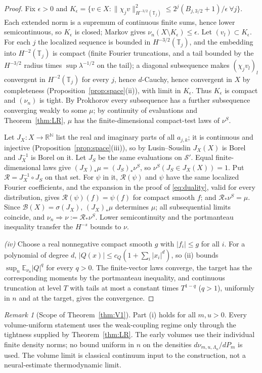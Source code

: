 \documentclass[11pt]{article}
\theoremstyle{plain}
\theoremstyle{definition}
\theoremstyle{remark}
\newtheorem{remark}[theorem]{Remark}
\newcommand{\R}{\mathbb{R}}
\newcommand{\N}{\mathbb{N}}
\newcommand{\E}{\mathbb{E}}
\newcommand{\T}{\mathbb{T}}
\newcommand{\cB}{\mathcal{B}}
\newcommand{\cS}{\mathcal{S}}
\begin{document}
\begin{proof}
Fix $\epsilon>0$ and $K_\epsilon=\{v\in X:\|\chi_jv\|^{2}_{H^{-3/2}(\T_j)}\le2^{j}(B_{j,3/2}+1)/\epsilon\ \forall j\}$.
Each extended norm is a supremum of continuous finite sums, hence lower
semicontinuous, so $K_\epsilon$ is closed; Markov gives $\nu_n(X\setminus K_\epsilon)\le\epsilon$. Let
$(v_l)\subset K_\epsilon$. For each $j$ the localized sequence is bounded in $H^{-3/2}(\T_j)$,
and the embedding into $H^{-2}(\T_j)$ is compact (finite Fourier truncations, and
a tail bounded by the $H^{-3/2}$ radius times $\sup\lambda^{-1/2}$ on the tail); a
diagonal subsequence makes $(\chi_jv_l)_l$ convergent in $H^{-2}(\T_j)$ for every $j$,
hence $d$-Cauchy, hence convergent in $X$ by completeness
(Proposition~\ref{prop:space}(ii)), with limit in $K_\epsilon$. Thus $K_\epsilon$ is compact
and $(\nu_n)$ is tight. By Prokhorov every subsequence has a further subsequence
converging weakly to some $\mu$; by continuity of evaluations and
Theorem~\ref{thm:LR}, $\mu$ has the finite-dimensional compact-test laws of $\nu^{S}$.

Let $J_X:X\to\R^{\N}$ list the real and imaginary parts of all $a_{j,k}$; it is
continuous and injective (Proposition~\ref{prop:space}(iii)), so by Lusin--Souslin
$J_X(X)$ is Borel and $J_X^{-1}$ is Borel on it. Let $J_S$ be the same evaluations on
$\cS'$. Equal finite-dimensional laws give $(J_X)_*\mu=(J_S)_*\nu^{S}$, so
$\nu^{S}(J_S\in J_X(X))=1$. Put $\mathcal R=J_X^{-1}\circ J_S$ on that set. For $\psi$ in it,
$\mathcal R(\psi)$ and $\psi$ have the same localized Fourier coefficients, and the
expansion in the proof of \eqref{eq:duality}, valid for every distribution, gives
$\mathcal R(\psi)(f)=\psi(f)$ for compact smooth $f$; and $\mathcal R_*\nu^{S}=\mu$. Since
$\cB(X)=\sigma(J_X)$, $(J_X)_*\mu$ determines $\mu$; all subsequential limits coincide, and
$\nu_n\Rightarrow\nu:=\mathcal R_*\nu^{S}$. Lower semicontinuity and the portmanteau inequality
transfer the $H^{-s}$ bounds to $\nu$.

\emph{(iv)} Choose a real nonnegative compact smooth $g$ with $|f_i|\le g$ for all
$i$. For a polynomial of degree $d$, $|Q(x)|\le c_Q(1+\sum_i|x_i|^{d})$, so (ii) bounds
$\sup_n\E_{\nu_n}|Q|^{q}$ for every $q>0$. The finite-vector laws converge, the target
has the corresponding moments by the portmanteau inequality, and continuous
truncation at level $T$ with tails at most a constant times $T^{1-q}$ ($q>1$),
uniformly in $n$ and at the target, gives the convergence.
\end{proof}

\begin{remark}[Scope of Theorem~\ref{thm:V1}]\label{rem:V1-scope}
Part (i) holds for all $m,u>0$. Every volume-uniform statement uses the weak-coupling
regime only through the tightness supplied by Theorem~\ref{thm:LR}. The early
volumes use their individual finite density norms; no bound uniform in $n$ on
the densities $d\nu_{m,u,\Lambda_n}/dP_m$ is used. The volume limit is classical
continuum input to the construction, not a neural-estimate thermodynamic limit.
\end{remark}
\end{document}
